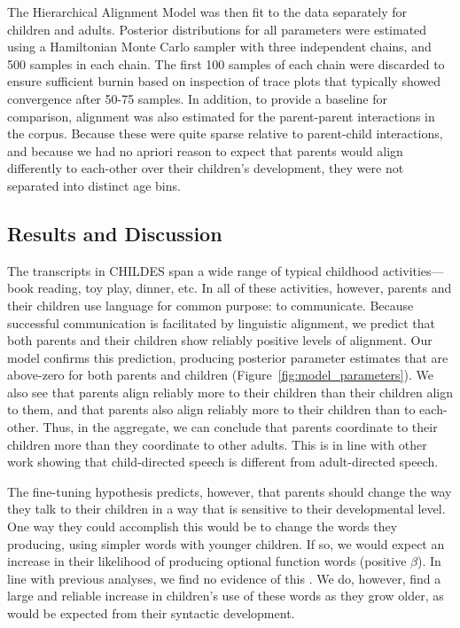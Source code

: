 \documentclass[10pt,letterpaper]{article}
\begin{document}
The Hierarchical Alignment Model was then fit to the data separately for children and adults. Posterior distributions for all parameters were estimated using a Hamiltonian Monte Carlo sampler with three independent chains, and 500 samples in each chain. The first 100 samples of each chain were discarded to ensure sufficient burnin based on inspection of trace plots that typically showed convergence after 50-75 samples. In addition, to provide a baseline for comparison, alignment was also estimated for the parent-parent interactions in the corpus. Because these were quite sparse relative to parent-child interactions, and because we had no apriori reason to expect that parents would align differently to each-other over their children's development, they were not separated into distinct age bins.

\subsection{Results and Discussion}

The transcripts in CHILDES span a wide range of typical childhood activities---book reading, toy play, dinner, etc. In all of these activities, however, parents and their children use language for common purpose: to communicate. Because successful communication is facilitated by linguistic alignment,  we predict that both parents and their children show reliably positive levels of alignment. Our model confirms this prediction, producing posterior parameter estimates that are above-zero for both parents and children (Figure~\ref{fig:model_parameters}). We also see that parents align reliably more to their children than their children align to them, and that parents also align reliably more to their children than to each-other. Thus, in the aggregate, we can conclude that parents coordinate to their children more than they coordinate to other adults. This is in line with other work showing that child-directed speech is different from adult-directed speech.

The fine-tuning hypothesis predicts, however, that parents should change the way they talk to their children in a way that is sensitive to their developmental level. One way they could accomplish this would be to change the words they producing, using simpler words with younger children. If so, we would expect an increase in their likelihood of producing optional function words (positive $\beta$). In line with previous analyses, we find no evidence of this \cite{newport1977, hayes1988}. We do, however, find a large and reliable increase in children's use of these words as they grow older, as would be expected from their syntactic development.
\end{document}
